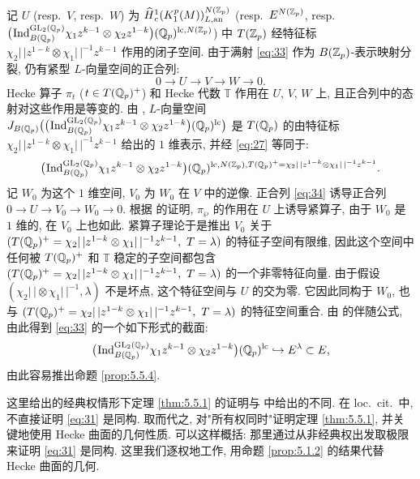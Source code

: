 记 $U$ (resp.\ $V$, resp.\ $W$) 为 $\widehat{H}{}_{c}^{1}(K_1^{p}(M))_{L,\mathrm{an}}^{N(\mathbb{Z}_p)}$ (resp.\ $E^{N(\mathbb{Z}_p)}$, resp.\ $\bigl(\prescript{}{}{\mathrm{Ind}}_{B(\mathbb{Q}_p)}^{\mathrm{GL}_2(\mathbb{Q}_p)} \chi_1z^{k-1} \otimes \chi_2z^{1-k}\bigr)(\mathbb{Q}_p)^{\mathrm{lc},N(\mathbb{Z}_p)}$) 中 $T(\mathbb{Z}_p)$ 经特征标 $\chi_2|\,|z^{1-k} \otimes \chi_1|\,|^{-1}z^{k-1}$ 作用的闭子空间.
由于满射 \eqref{eq:33} 作为 $B(\mathbb{Z}_p)$-表示映射分裂, 仍有紧型 $L$-向量空间的正合列:
\begin{equation}
\label{eq:34}
0 \to U \to V \to W \to 0.
\end{equation}
Hecke 算子 $\pi_t$ ($t \in T(\mathbb{Q}_p)^{+}$) 和 Hecke 代数 $\mathbb{T}$ 作用在 $U$, $V$, $W$ 上, 且正合列中的态射对这些作用是等变的.
由 \cite[Lem.~3.5.2]{ref:22}, $L$-向量空间 $J_{B(\mathbb{Q}_p)}\bigl(\bigl(\prescript{}{}{\mathrm{Ind}}_{B(\mathbb{Q}_p)}^{\mathrm{GL}_2(\mathbb{Q}_p)} \chi_1z^{k-1} \otimes \chi_2z^{1-k}\bigr)(\mathbb{Q}_p)^{\mathrm{lc}}\bigr)$ 是 $T(\mathbb{Q}_p)$ 的由特征标 $\chi_2|\,|z^{1-k} \otimes \chi_1|\,|^{-1}z^{k-1}$ 给出的 $1$ 维表示, 并经 \eqref{eq:27} 等同于:
\[
\bigl(\prescript{}{}{\mathrm{Ind}}_{B(\mathbb{Q}_p)}^{\mathrm{GL}_2(\mathbb{Q}_p)} \chi_1z^{k-1} \otimes \chi_2z^{1-k}\bigr)(\mathbb{Q}_p)^{\mathrm{lc},N(\mathbb{Z}_p),T(\mathbb{Q}_p)^{+} = \chi_2|\,|z^{1-k} \otimes \chi_1|\,|^{-1}z^{k-1}}.
\]
记 $W_0$ 为这个 $1$ 维空间, $V_0$ 为 $W_0$ 在 $V$ 中的逆像.
正合列 \eqref{eq:34} 诱导正合列 $0 \to U \to V_0 \to W_0 \to 0$.
根据 \cite[Prop.~4.2.33]{ref:22} 的证明, $\pi_{\wp}$ 的作用在 $U$ 上诱导紧算子, 由于 $W_0$ 是 $1$ 维的, 在 $V_0$ 上也如此.
紧算子理论于是推出 $V_0$ 关于 $(T(\mathbb{Q}_p)^{+} = \chi_2|\,|z^{1-k} \otimes \chi_1|\,|^{-1}z^{k-1},\ T = \lambda)$ 的特征子空间有限维, 因此这个空间中任何被 $T(\mathbb{Q}_p)^{+}$ 和 $\mathbb{T}$ 稳定的子空间都包含 $(T(\mathbb{Q}_p)^{+} = \chi_2|\,|z^{1-k} \otimes \chi_1|\,|^{-1}z^{k-1},\ T = \lambda)$ 的一个非零特征向量.
由于假设 $(\chi_2|\,| \otimes \chi_1|\,|^{-1},\lambda)$ 不是坏点, 这个特征空间与 $U$ 的交为零.
它因此同构于 $W_0$, 也与 $(T(\mathbb{Q}_p)^{+} = \chi_2|\,|z^{1-k} \otimes \chi_1|\,|^{-1}z^{k-1},\ T = \lambda)$ 的特征空间重合.
由 \cite[Th.~3.5.6]{ref:22} 的伴随公式, 由此得到 \eqref{eq:33} 的一个如下形式的截面:
\[
\bigl(\prescript{}{}{\mathrm{Ind}}_{B(\mathbb{Q}_p)}^{\mathrm{GL}_2(\mathbb{Q}_p)} \chi_1z^{k-1} \otimes \chi_2z^{1-k}\bigr)(\mathbb{Q}_p)^{\mathrm{lc}} \hookrightarrow E^{\lambda} \subset E,
\]
由此容易推出命题 \ref{prop:5.5.4}.

\begin{remark}\label{rem:5.6.1}
这里给出的经典权情形下定理 \ref{thm:5.5.1} 的证明与 \cite[Lem.~4.5.13]{ref:24} 中给出的不同.
在 loc.\ cit.\ 中, 不直接证明 \eqref{eq:31} 是同构.
取而代之, 对"所有权同时"证明定理 \ref{thm:5.5.1}, 并关键地使用 Hecke 曲面的几何性质.
可以这样概括: 那里通过从非经典权出发取极限来证明 \eqref{eq:31} 是同构.
这里我们逐权地工作, 用命题 \ref{prop:5.1.2} 的结果代替 Hecke 曲面的几何.
\end{remark}


